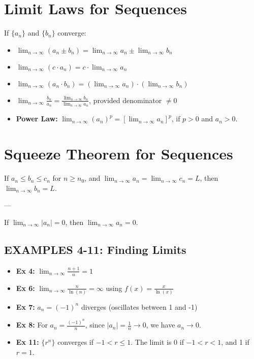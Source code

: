 \documentclass{article}
\begin{document}
\section*{Limit Laws for Sequences}
If \(\{a_n\}\) and \(\{b_n\}\) converge:
\begin{itemize}
    \item \( \lim_{n\to\infty} (a_n \pm b_n) = \lim_{n\to\infty} a_n \pm \lim_{n\to\infty} b_n \)
    \item \( \lim_{n\to\infty} (c \cdot a_n) = c \cdot \lim_{n\to\infty} a_n \)
    \item \( \lim_{n\to\infty} (a_n \cdot b_n) = (\lim_{n\to\infty} a_n) \cdot (\lim_{n\to\infty} b_n) \)
    \item \( \lim_{n\to\infty} \frac{b_n}{a_n} = \frac{\lim_{n\to\infty} b_n}{\lim_{n\to\infty} a_n} \), provided denominator \( \neq 0 \)
    \item \textbf{Power Law:} \( \lim_{n\to\infty} (a_n)^p = \left[\lim_{n\to\infty} a_n\right]^p \), if \(p > 0\) and \(a_n > 0\).
\end{itemize}

\section*{Squeeze Theorem for Sequences}
\begin{tcolorbox}[colback=white, colframe=orange!80!white, title=Theorems, boxrule=0.5mm, arc=3mm]
If \(a_n \leq b_n \leq c_n\) for \(n \geq n_0\), and \( \lim_{n\to\infty} a_n = \lim_{n\to\infty} c_n = L \), then \( \lim_{n\to\infty} b_n = L \).
\begin{center} --- \end{center}
If \( \lim_{n\to\infty} |a_n| = 0 \), then \( \lim_{n\to\infty} a_n = 0 \).
\end{tcolorbox}

\subsection*{EXAMPLES 4-11: Finding Limits}
\begin{itemize}
    \item \textbf{Ex 4:} \( \lim_{n\to\infty} \frac{n+1}{n} = 1 \)
    \item \textbf{Ex 6:} \( \lim_{n\to\infty} \frac{n}{\ln(n)} = \infty \) using \(f(x) = \frac{x}{\ln(x)}\)
    \item \textbf{Ex 7:} \(a_n = (-1)^n\) diverges (oscillates between 1 and -1)
    \item \textbf{Ex 8:} For \(a_n = \frac{(-1)^n}{n}\), since \(|a_n| = \frac{1}{n} \to 0\), we have \(a_n \to 0\).
    \item \textbf{Ex 11:} \(\{r^n\}\) converges if \(-1 < r \leq 1\). The limit is 0 if \(-1 < r < 1\), and 1 if \(r = 1\).
\end{itemize}
\end{document}
